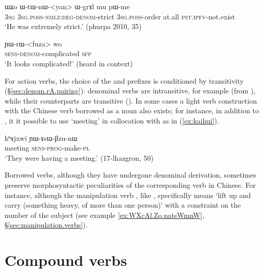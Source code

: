 \begin{exe}
\ex \label{ex:WtWnWyan}
\gll ɯʑo ɯ-tɯ-nɯ-<yan> ɯ-grɤl mu pɯ-me \\
\textsc{3sg} \textsc{3sg}.\textsc{poss}-\textsc{nmlz}:\textsc{deg}-\textsc{denom}-strict \textsc{3sg}.\textsc{poss}-order at.all \textsc{pst}.\textsc{ipfv}-not.exist \\
\glt `He was extremely strict.' (phurpa 2010, 35)
\end{exe}

\begin{exe}
\ex \label{ex:YWrWfuza}
\gll  ɲɯ-rɯ-<fuza> wo \\
\textsc{sens}-\textsc{denom}-complicated \textsc{sfp} \\
\glt `It looks complicated!' (heard in context)
\end{exe}

For action verbs, the choice of the  and  prefixes is conditioned by transitivity (§\ref{sec:denom.rA.pairing}):  denominal verbs are intransitive, for example  (from ), while their  counterparts are transitive (). In some cases a light verb construction with the Chinese verb borrowed as a noun also exists; for instance, in addition to , it it possible to use  `meeting' in collocation with  as in (\ref{ex:kaihui}). 

\begin{exe}
\ex \label{ex:kaihui}
\gll kʰɤjxwi ɲɯ-ɤsɯ-βzu-nɯ \\
meeting \textsc{sens}-\textsc{prog}-make-\textsc{pl} \\
\glt `They were having a meeting.' (17-lhazgron, 50)
\end{exe}


Borrowed verbs, although they have undergone denominal derivation, sometimes preserve morphosyntactic peculiarities of the corresponding verb in Chinese. For instance, although the manipulation verb , like , specifically means `lift up and carry (something heavy, of more than one person)' with a constraint on the number of the subject (see example \ref{ex:WXcAl.Zo.natsWmnW}, §\ref{sec:manipulation.verbs}).

\section{Compound verbs} \label{sec:denom.compound.verbs}

